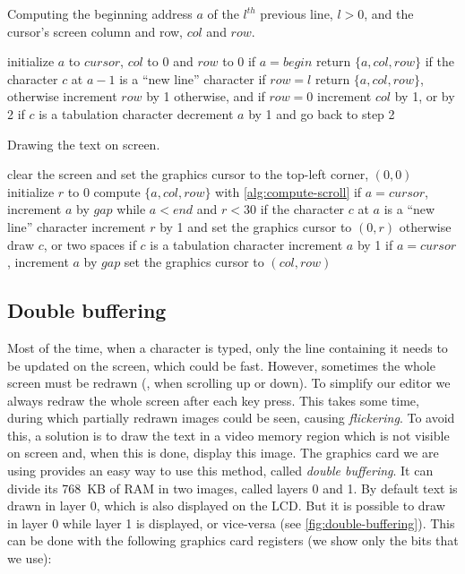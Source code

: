 \begin{Algorithm}
\caption{Computing the beginning address $a$ of the $l^{th}$ previous line,
  $l>0$, and the cursor's screen column and row, $col$ and
  $row$.}\label{alg:compute-scroll}
\begin{algorithmic}[1]
\State initialize $a$ to $cursor$, $col$ to 0 and $row$ to 0
\State if $a = begin$ return $\{a, col, row\}$
\Begin if the character $c$ at $a-1$ is a ``new line'' character
  \State if $row=l$ return $\{a, col, row\}$, otherwise increment $row$ by 1
\Continue otherwise, and if $row=0$
  \State increment $col$ by 1, or by 2 if $c$ is a tabulation character
\End
\State decrement $a$ by 1 and go back to step 2
\end{algorithmic}
\end{Algorithm}

\begin{Algorithm}
\caption{Drawing the text on screen.}\label{alg:draw-text}
\begin{algorithmic}[1]
\State clear the screen and set the graphics cursor to the top-left
corner, $(0,0)$
\State initialize $r$ to 0
\State compute $\{a, col, row\}$ with \cref{alg:compute-scroll}
\State if $a=cursor$, increment $a$ by $gap$
\Begin while $a < end$ and $r < 30$
  \Begin if the character $c$ at $a$ is a ``new line'' character
    \State increment $r$ by 1 and set the graphics cursor to $(0, r)$
  \Continue otherwise
    \State draw $c$, or two spaces if $c$ is a tabulation character
  \End
  \State increment $a$ by 1
  \State if $a=cursor$, increment $a$ by $gap$
\End
\State set the graphics cursor to $(col,row)$
\end{algorithmic}
\end{Algorithm}

\subsection{Double buffering}\label{subsection:double-buffering}

Most of the time, when a character is typed, only the line containing it needs
to be updated on the screen, which could be fast. However, sometimes the whole
screen must be redrawn (\eg, when scrolling up or down). To simplify our editor
we always redraw the whole screen after each key press. This takes some time,
during which partially redrawn images could be seen, causing {\em flickering}.
To avoid this, a solution is to draw the text in a video memory region which is
not visible on screen and, when this is done, display this image. The graphics
card we are using provides an easy way to use this method, called {\em double
buffering}. It can divide its 768~KB of RAM in two images, called layers 0 and
1. By default text is drawn in layer 0, which is also displayed on the LCD. But
it is possible to draw in layer 0 while layer 1 is displayed, or vice-versa
(see \cref{fig:double-buffering}). This can be done with the following graphics
card registers (we show only the bits that we use):

